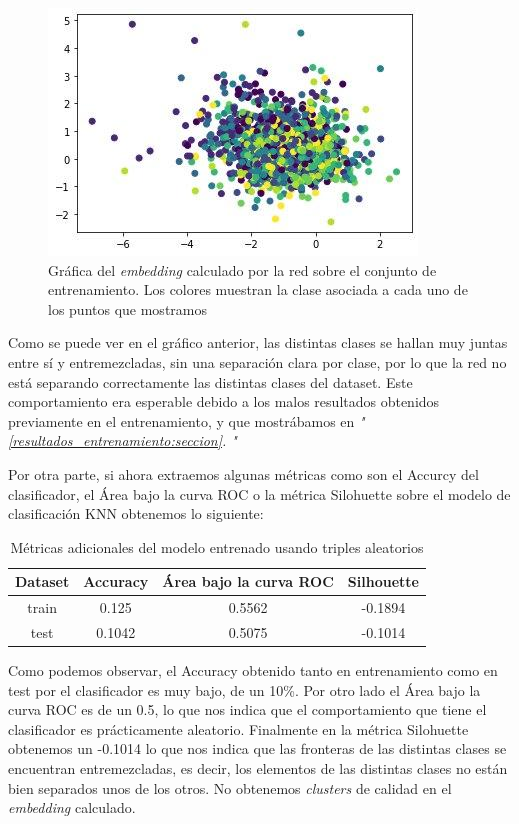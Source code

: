 \documentclass[11pt]{article}
\newcommand{\customcite}[1]{\emph{"\ref{#1}. \nameref{#1}"}}
\begin{document}
\begin{figure}[H]
    \centering
    \includegraphics[width = 0.4 \textwidth]{random_embedding}
    \caption{Gráfica del \emph{embedding} calculado por la red sobre el conjunto de entrenamiento. Los colores muestran la clase asociada a cada uno de los puntos que mostramos}
\end{figure}

Como se puede ver en el gráfico anterior, las distintas clases se hallan muy juntas entre sí y entremezcladas, sin una separación clara por clase, por lo que la red no está separando correctamente las distintas clases del dataset. Este comportamiento era esperable debido a los malos resultados obtenidos previamente en el entrenamiento, y que mostrábamos en \customcite{resultados_entrenamiento:seccion}

Por otra parte, si ahora extraemos algunas métricas como son el Accurcy del clasificador, el Área bajo la curva ROC o la métrica Silohuette sobre el modelo de clasificación KNN obtenemos lo siguiente:

\begin{table}[H]
\begin{center}
    \begin{tabular}{|c|c|c|c|}
        \hline
        Dataset & Accuracy & Área bajo la curva ROC & Silhouette \\
        \hline
        train & 0.125 & 0.5562 & -0.1894  \\
        test & 0.1042 & 0.5075 &  -0.1014 \\
        \hline
    \end{tabular}
\end{center}
   \caption{Métricas adicionales del modelo entrenado usando triples aleatorios}
    \label{triples_aleatorios_resultados_clasificacion:tabla}
\end{table}


Como podemos observar, el Accuracy obtenido tanto en entrenamiento como en test por el clasificador es muy bajo, de un 10\%. Por otro lado el Área bajo la curva ROC es de un 0.5, lo que nos indica que el comportamiento que tiene el clasificador es prácticamente aleatorio. Finalmente en la métrica Silohuette obtenemos un -0.1014 lo que nos indica que las fronteras de las distintas clases se encuentran entremezcladas, es decir, los elementos de las distintas clases no están bien separados unos de los otros. No obtenemos \emph{clusters} de calidad en el \emph{embedding} calculado.
\end{document}
